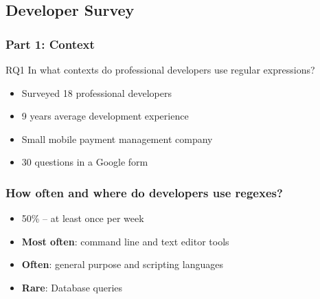 \subsection{Developer Survey}

\begin{frame}
\frametitle{Part 1: Context}

\begin{block}{RQ1}
In what contexts do professional developers use regular expressions?
\end{block}
%
\begin{itemize}
	\item Surveyed 18 professional developers 
	\item 9 years average development experience
	\item Small mobile payment management company
	\item 30 questions in a Google form
\end{itemize}
\end{frame}

\begin{frame}
\frametitle{How often and where do developers use regexes?}

\begin{itemize}
	\item 50\%  -- at least once per week
\vspace{12pt}
	\item<2-> {\bf Most often}: command line and text editor tools
	\item<2-> {\bf Often}: general purpose and scripting  languages
	\item<2-> {\bf Rare}: Database queries
\end{itemize}
\end{frame}


